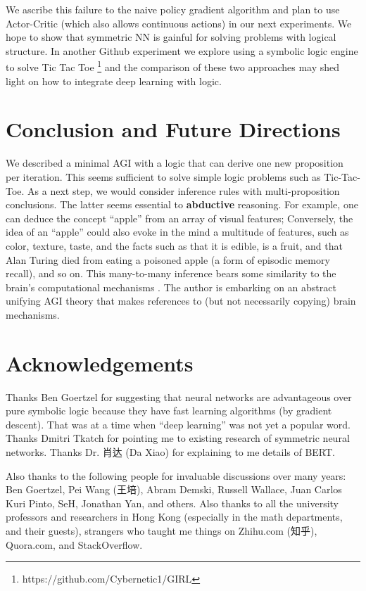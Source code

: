 \documentclass[orivec]{llncs}
\begin{document}
We ascribe this failure to the naive policy gradient algorithm and plan to use Actor-Critic (which also allows continuous actions) in our next experiments.  We hope to show that symmetric NN is gainful for solving problems with logical structure.  In another Github experiment we explore using a symbolic logic engine to solve Tic Tac Toe \footnote{ https://github.com/Cybernetic1/GIRL } and the comparison of these two approaches may shed light on how to integrate deep learning with logic.

\section{Conclusion and Future Directions}

We described a minimal AGI with a logic that can derive one new proposition per iteration.  This seems sufficient to solve simple logic problems such as Tic-Tac-Toe.  As a next step, we would consider inference rules with multi-proposition conclusions.  The latter seems essential to \textbf{abductive} reasoning.  For example, one can deduce the concept ``apple'' from an array of visual features;  Conversely, the idea of an ``apple'' could also evoke in the mind a multitude of features, such as color, texture, taste, and the facts such as that it is edible, is a fruit, and that Alan Turing died from eating a poisoned apple (a form of episodic memory recall), and so on.  This many-to-many inference bears some similarity to the brain's computational mechanisms \cite{Rolls2016} \cite{Rolls2021} \cite{Boraud2020}.  The author is embarking on an abstract unifying AGI theory that makes references to (but not necessarily copying) brain mechanisms.

\section*{Acknowledgements}

Thanks Ben Goertzel for suggesting that neural networks are advantageous over pure symbolic logic because they have fast learning algorithms (by gradient descent).  That was at a time when ``deep learning'' was not yet a popular word.  Thanks Dmitri Tkatch for pointing me to existing research of symmetric neural networks.  Thanks Dr. 肖达 (Da Xiao) for explaining to me details of BERT. 

Also thanks to the following people for invaluable discussions over many years:  Ben Goertzel, Pei Wang (王培), Abram Demski, Russell Wallace, Juan Carlos Kuri Pinto, SeH, Jonathan Yan, and others.  Also thanks to all the university professors and researchers in Hong Kong (especially in the math departments, and their guests), strangers who taught me things on Zhihu.com (知乎), Quora.com, and StackOverflow.


\end{document}
